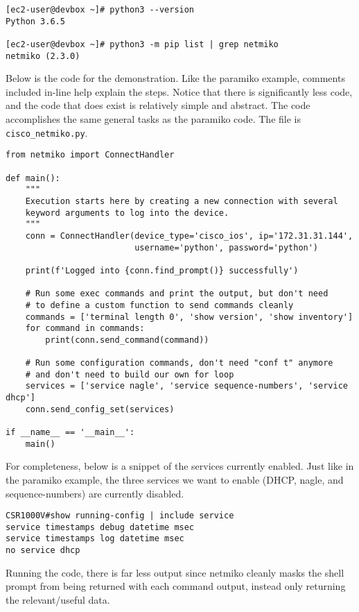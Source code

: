 \begin{verbatim}
[ec2-user@devbox ~]# python3 --version
Python 3.6.5

[ec2-user@devbox ~]# python3 -m pip list | grep netmiko
netmiko (2.3.0)
\end{verbatim}

Below is the code for the demonstration. Like the paramiko example, comments
included in-line help explain the steps. Notice that there is significantly
less code, and the code that does exist is relatively simple and abstract. The
code accomplishes the same general tasks as the paramiko code. The file is
\verb|cisco_netmiko.py|.

\begin{verbatim}
from netmiko import ConnectHandler

def main():
    """
    Execution starts here by creating a new connection with several
    keyword arguments to log into the device.
    """
    conn = ConnectHandler(device_type='cisco_ios', ip='172.31.31.144',
                          username='python', password='python')

    print(f'Logged into {conn.find_prompt()} successfully')

    # Run some exec commands and print the output, but don't need
    # to define a custom function to send commands cleanly
    commands = ['terminal length 0', 'show version', 'show inventory']
    for command in commands:
        print(conn.send_command(command))

    # Run some configuration commands, don't need "conf t" anymore
    # and don't need to build our own for loop
    services = ['service nagle', 'service sequence-numbers', 'service dhcp']
    conn.send_config_set(services)

if __name__ == '__main__':
    main()
\end{verbatim}

For completeness, below is a snippet of the services currently enabled. Just
like in the paramiko example, the three services we want to enable (DHCP,
nagle, and sequence-numbers) are currently disabled.

\begin{verbatim}
CSR1000V#show running-config | include service
service timestamps debug datetime msec
service timestamps log datetime msec
no service dhcp
\end{verbatim}

Running the code, there is far less output since netmiko cleanly masks the
shell prompt from being returned with each command output, instead only
returning the relevant/useful data.

